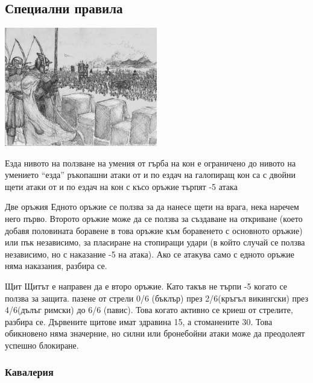 \subsection{Специални правила}
\begin{center}
\includegraphics[width=0.5\textwidth]{../images/siege}~
\\[1cm]
\end{center}

Езда
нивото на ползване на умения от гърба на кон е ограничено до нивото на умението “езда”
ръкопашни атаки от и по ездач на галопиращ кон са с двойни щети
атаки от и по ездач на кон с късо оръжие търпят -5 атака

Две оръжия
Едното оръжие се ползва за да нанесе щети на врага, нека наречем него първо. Второто оръжие може да се ползва за създаване на откриване (което добавя половината боравене в това оръжие към боравенето с основното оръжие) или пък независимо, за пласиране на стопиращи удари (в който случай се ползва независимо, но с наказание -5 на атака). Ако се атакува само с едното оръжие няма наказания, разбира се.

Щит
Щитът е направен да е второ оръжие. Като такъв не търпи -5 когато се ползва за защита.
пазене от стрели 0/6 (бъклър) през 2/6(кръгъл викингски) през 4/6(дълъг римски) до 6/6 (павис). Това когато активно се криеш от стрелите, разбира се.
Дървените щитове имат здравина 15, а стоманените 30. Това обикновено няма значерние, но силни или бронебойни атаки може да преодолеят успешно блокиране.
\subsubsection{Кавалерия}
